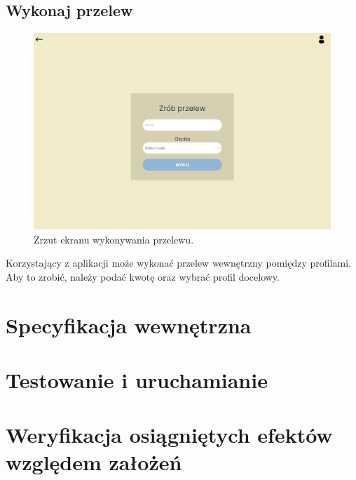\documentclass[12pt,a4paper,oneside]{article}
\begin{document}
\subsection{Wykonaj przelew}
\begin{figure}[H]
    \centering
    \includegraphics[width=\hsize,keepaspectratio]{images/make_transfer.png}
    \caption{Zrzut ekranu wykonywania przelewu.}
\end{figure}
Korzystający z aplikacji może wykonać przelew wewnętrzny pomiędzy profilami.
Aby to zrobić, należy podać kwotę oraz wybrać profil docelowy.

\section{Specyfikacja wewnętrzna}

\section{Testowanie i uruchamianie}

\section{Weryfikacja osiągniętych efektów względem założeń}
\end{document}
